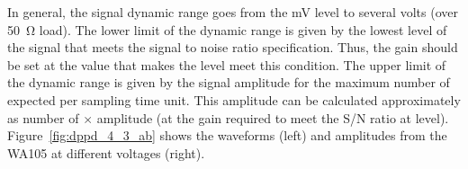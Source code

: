 
In general, the  signal dynamic range goes from the \si{mV} level to several volts (over \SI{50}{\ohm} load). The lower limit of the  dynamic range is given by the lowest level of the  signal that meets the signal to noise ratio specification. Thus, the  gain should be set at the value that makes the  level meet this condition. The upper limit of the dynamic range is given by the  signal amplitude for the maximum number of  expected per sampling time unit. This amplitude can be calculated approximately as number of  $\times$  amplitude (at the gain required to meet the S/N ratio at  level). Figure~\ref{fig:dppd_4_3_ab} shows the  waveforms (left) and amplitudes from the WA105 at different voltages (right).


